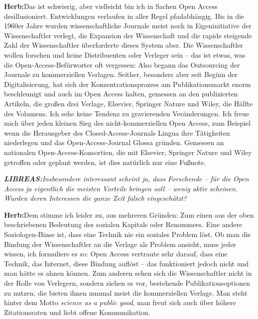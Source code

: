 \documentclass[a4paper,
fontsize=11pt,
oneside,
numbers=noperiodatend,
parskip=half-,
bibliography=totoc,
final
]{scrartcl}
\begin{document}
\textbf{Herb:}Das ist schwierig, aber vielleicht bin ich in Sachen Open
Access desillusioniert. Entwicklungen verlaufen in aller Regel
pfadabhängig. Bis in die 1960er Jahre wurden wissenschaftliche Journale
meist noch in Eigeninitiative der Wissenschaftler verlegt, die Expansion
der Wissenschaft und die rapide steigende Zahl der Wissenschaftler
überforderte dieses System aber. Die Wissenschaftler wollen forschen und
keine Distribuenten oder Verleger sein -- das ist etwas, was die
Open-Access-Befürworter oft vergessen: Also begann das Outsourcing der
Journale zu kommerziellen Verlagen. Seither, besonders aber seit Beginn
der Digitalisierung, hat sich der Konzentrationsprozess am
Publikationsmarkt enorm beschleunigt und auch im Open Access halten,
gemessen an den publizierten Artikeln, die großen drei Verlage,
Elsevier, Springer Nature und Wiley, die Hälfte des Volumens. Ich sehe
keine Tendenz zu gravierenden Veränderungen. Ich freue mich über jeden
kleinen Sieg des nicht-kommerziellen Open Access, zum Beispiel wenn die
Herausgeber des Closed-Access-Journals Lingua ihre Tätigkeiten
niederlegen und das Open-Access-Journal Glossa gründen. Gemessen an
nationalen Open-Access-Konsortien, die mit Elsevier, Springer Nature und
Wiley getroffen oder geplant werden, ist dies natürlich nur eine
Fußnote.

\emph{\textbf{LIBREAS:}Insbesondere interessant scheint ja, dass
Forschende -- für die Open Access ja eigentlich die meisten Vorteile
bringen soll -- wenig aktiv scheinen. Wurden deren Interessen die ganze
Zeit falsch eingeschätzt?}

\textbf{Herb:}Dem stimme ich leider zu, aus mehreren Gründen: Zum einen
aus der oben beschriebenen Bedeutung des sozialen Kapitals oder
Renommees. Eine andere Soziologen-Binse ist, dass eine Technik nie ein
soziales Problem löst. Ob man die Bindung der Wissenschaftler an die
Verlage als Problem ansieht, muss jeder wissen, ich formuliere es so:
Open Access vertraute sehr darauf, dass eine Technik, das Internet,
diese Bindung auflöst -- das funktioniert jedoch nicht und man hätte es
ahnen können. Zum anderen sehen sich die Wissenschaftler nicht in der
Rolle von Verlegern, sondern ziehen es vor, bestehende
Publikationsoptionen zu nutzen, die bieten ihnen nunmal meist die
kommerziellen Verlage. Man steht hinter dem Motto \emph{science as a
public good}, man freut sich auch über höhere Zitationsraten und liebt
offene Kommunikation.
\end{document}
